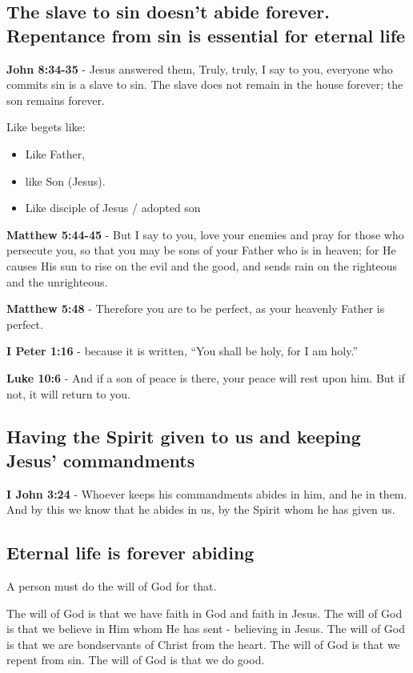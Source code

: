 \documentclass[11pt]{article}
\begin{document}
\subsection{The slave to sin doesn't abide forever. Repentance from sin is essential for eternal life}
\label{sec:org0604d6f}
\textbf{John 8:34-35} - Jesus answered them, Truly, truly, I say to you, everyone who commits sin is a slave to sin. The slave does not remain in the house forever; the son remains forever.

Like begets like:
\begin{itemize}
\item Like Father,
\item like Son (Jesus).
\item Like disciple of Jesus / adopted son
\end{itemize}

\textbf{Matthew 5:44-45} - But I say to you, love your enemies and pray for those who persecute you, so that you may be sons of your Father who is in heaven; for He causes His sun to rise on the evil and the good, and sends rain on the righteous and the unrighteous.

\textbf{Matthew 5:48} - Therefore you are to be perfect, as your heavenly Father is perfect.

\textbf{I Peter 1:16} - because it is written, “You shall be holy, for I am holy.”

\textbf{Luke 10:6} - And if a son of peace is there, your peace will rest upon him. But if not, it will return to you.

\subsection{Having the Spirit given to us and keeping Jesus' commandments}
\label{sec:org1b0e429}
\textbf{I John 3:24} - Whoever keeps his commandments abides in him, and he in them. And by this we know that he abides in us, by the Spirit whom he has given us.

\subsection{Eternal life is forever abiding}
\label{sec:org5143f4b}
A person must do the will of God for that.

The will of God is that we have faith in God and faith in Jesus.
The will of God is that we believe in Him whom He has sent - believing in Jesus.
The will of God is that we are bondservants of Christ from the heart.
The will of God is that we repent from sin.
The will of God is that we do good.
\end{document}
